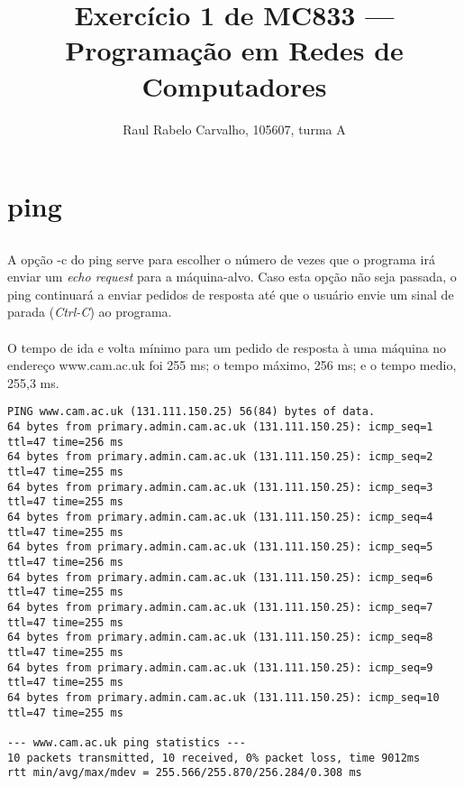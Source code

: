\documentclass[a4paper,10pt,oneside,final,titlepage,onecolumn]{article}
\title{Exercício 1 de MC833 --- Programação em Redes de Computadores}
\author{Raul Rabelo Carvalho, 105607, turma A}
\begin{document}
\maketitle

\section{ping}

\subsection{}
\paragraph{}A opção \mbox{-c} do ping serve para escolher o número de vezes que o programa irá enviar um \emph{echo request} para a máquina-alvo. Caso esta opção não seja passada, o ping continuará a enviar pedidos de resposta até que o usuário envie um sinal de parada (\emph{Ctrl-C}) ao programa.
\paragraph{}O tempo de ida e volta mínimo para um pedido de resposta à uma máquina no endereço \mbox{www.cam.ac.uk} foi 255 ms; o tempo máximo, 256 ms; e o tempo medio, 255,3 ms.
\begin{lstlisting}
PING www.cam.ac.uk (131.111.150.25) 56(84) bytes of data.
64 bytes from primary.admin.cam.ac.uk (131.111.150.25): icmp_seq=1 ttl=47 time=256 ms
64 bytes from primary.admin.cam.ac.uk (131.111.150.25): icmp_seq=2 ttl=47 time=255 ms
64 bytes from primary.admin.cam.ac.uk (131.111.150.25): icmp_seq=3 ttl=47 time=255 ms
64 bytes from primary.admin.cam.ac.uk (131.111.150.25): icmp_seq=4 ttl=47 time=255 ms
64 bytes from primary.admin.cam.ac.uk (131.111.150.25): icmp_seq=5 ttl=47 time=256 ms
64 bytes from primary.admin.cam.ac.uk (131.111.150.25): icmp_seq=6 ttl=47 time=255 ms
64 bytes from primary.admin.cam.ac.uk (131.111.150.25): icmp_seq=7 ttl=47 time=255 ms
64 bytes from primary.admin.cam.ac.uk (131.111.150.25): icmp_seq=8 ttl=47 time=255 ms
64 bytes from primary.admin.cam.ac.uk (131.111.150.25): icmp_seq=9 ttl=47 time=255 ms
64 bytes from primary.admin.cam.ac.uk (131.111.150.25): icmp_seq=10 ttl=47 time=255 ms

--- www.cam.ac.uk ping statistics ---
10 packets transmitted, 10 received, 0% packet loss, time 9012ms
rtt min/avg/max/mdev = 255.566/255.870/256.284/0.308 ms
\end{lstlisting}
\end{document}
